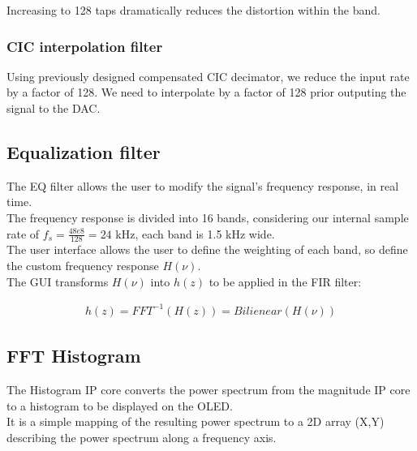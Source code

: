 \documentclass{article}
\begin{document}
\begin{center}
\begin{minipage}{0.40\linewidth}
		Increasing to 128 taps dramatically reduces
		the distortion within the band.
	\end{minipage}
\end{center}

\subsubsection{CIC interpolation filter}

Using previously designed compensated CIC decimator,
we reduce the input rate by a factor of 128.
We need to interpolate by a factor of 128 prior
outputing the signal to the DAC.


\newpage
\subsection{Equalization filter}

The EQ filter allows the user 
to modify the signal's frequency response,
in real time. \\

The frequency response is divided into 16 bands,
considering our internal sample rate of 
$f_s = \frac{48e8}{128} = 24$ kHz,
each band is 1.5 kHz wide. \\

The user interface allows the user
to define the weighting of each band,
so define the custom frequency response
$H(\nu)$. \\

The GUI transforms $H(\nu)$ into $h(z)$
to be applied in the FIR filter:

\begin{equation}
	\begin{split}
	h(z) = FFT^{-1}\left(H(z)\right) = Bilienear(H(\nu))
	\end{split}
\end{equation}

\newpage
\subsection{FFT Histogram}

The Histogram IP core converts
the power spectrum from the
magnitude IP core
to a histogram to be displayed on the OLED. \\

It is a simple mapping of the resulting
power spectrum to a 2D array (X,Y) describing
the power spectrum along a frequency axis. \\ 
\end{document}
